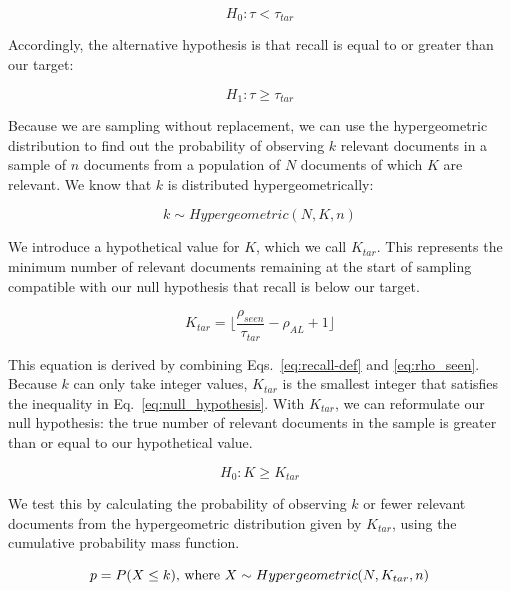 \documentclass{bmcart}
\begin{document}
	\begin{equation}
	H_0 : \tau < \tau_{tar}
	\label{eq:null_hypothesis}
	\end{equation}
	
	Accordingly, the alternative hypothesis is that recall is equal to or greater than our target: 
	
	\begin{equation}
	H_1 : \tau \geq \tau_{tar}
	\end{equation}
	
	Because we are sampling without replacement, we can use the hypergeometric distribution to find out the probability of observing $k$ relevant documents in a sample of $n$ documents from a population of $N$ documents of which $K$ are relevant. We know that $k$ is distributed hypergeometrically:
	
	\begin{equation}
	k \sim Hypergeometric(N, K, n)
	\end{equation}
	
	We introduce a hypothetical value for $K$, which we call $K_{tar}$. This represents the minimum number of relevant documents remaining at the start of sampling compatible with our null hypothesis that recall is below our target.
	
	\begin{equation}
	K_{tar} = \lfloor \frac{\rho_{seen}}{\tau_{tar}}-\rho_{AL}+1 \rfloor
	\end{equation}
	
	This equation is derived by combining Eqs.~\ref{eq:recall-def} and \ref{eq:rho_seen}. Because $k$ can only take integer values, $K_{tar}$ is the smallest integer that satisfies the inequality in Eq.~\ref{eq:null_hypothesis}.
	With $K_{tar}$, we can reformulate our null hypothesis: the true number of relevant documents in the sample is greater than or equal to our hypothetical value.
	
	\begin{equation}
	H_0 : K \geq K_{tar}
	\end{equation}
	
	We test this by calculating the probability of observing $k$ or fewer relevant documents from the hypergeometric distribution given by $K_{tar}$, using the cumulative probability mass function.
	
	\begin{equation}
	p = P(X \leq k)$, where $X \sim Hypergeometric(N,K_{tar},n)
	\label{eq:p-value}
	\end{equation}
	
\end{document}
